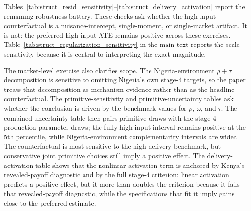 \documentclass[11pt]{article}
\begin{document}




Tables~\ref{tab:struct_resid_sensitivity}--\ref{tab:struct_delivery_activation} report the remaining robustness battery. These checks ask whether the high-input counterfactual is a nuisance-intercept, single-moment, or single-market artifact. It is not: the preferred high-input ATE remains positive across these exercises. Table~\ref{tab:struct_regularization_sensitivity} in the main text reports the scale sensitivity because it is central to interpreting the exact magnitude.

The market-level exercise also clarifies scope. The Nigeria-environment $\rho+\tau$ decomposition is sensitive to omitting Nigeria's own stage-4 targets, so the paper treats that decomposition as mechanism evidence rather than as the headline counterfactual. The primitive-sensitivity and primitive-uncertainty tables ask whether the conclusion is driven by the benchmark values for $\rho$, $\omega$, and $\tau$. The combined-uncertainty table then pairs primitive draws with the stage-4 production-parameter draws; the fully high-input interval remains positive at the 5th percentile, while Nigeria-environment complementarity intervals are wider. The counterfactual is most sensitive to the high-delivery benchmark, but conservative joint primitive choices still imply a positive effect. The delivery-activation table shows that the nonlinear activation term is anchored by Kenya's revealed-payoff diagnostic and by the full stage-4 criterion: linear activation predicts a positive effect, but it more than doubles the criterion because it fails that revealed-payoff diagnostic, while the specifications that fit it imply gains close to the preferred estimate.














\end{document}
